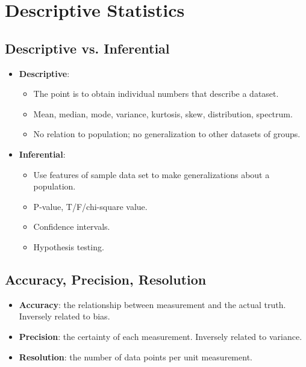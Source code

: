 \documentclass[12pt,a4paper]{article}
\begin{document}

\clearpage
\section{Descriptive Statistics}
\subsection{Descriptive vs. Inferential}
\begin{itemize}
    \item \textbf{Descriptive}:
        \begin{itemize}
            \item The point is to obtain individual numbers that describe a dataset.
            \item Mean, median, mode, variance, kurtosis, skew, distribution, spectrum.
            \item No relation to population; no generalization to other datasets of groups.
        \end{itemize}
    \item \textbf{Inferential}: 
        \begin{itemize}
            \item Use features of sample data set to make generalizations about a population.
            \item P-value, T/F/chi-square value.
            \item Confidence intervals.
            \item Hypothesis testing.
        \end{itemize}
\end{itemize}

\subsection{Accuracy, Precision, Resolution}
\begin{itemize}
    \item \textbf{Accuracy}: the relationship between measurement and the actual truth. Inversely related to {\color{o-Sun}bias}.
    \item \textbf{Precision}: the certainty of each measurement. Inversely related to {\color{o-Sun}variance}.
    \item \textbf{Resolution}: the number of data points per unit measurement.
\end{itemize}
\end{document}
